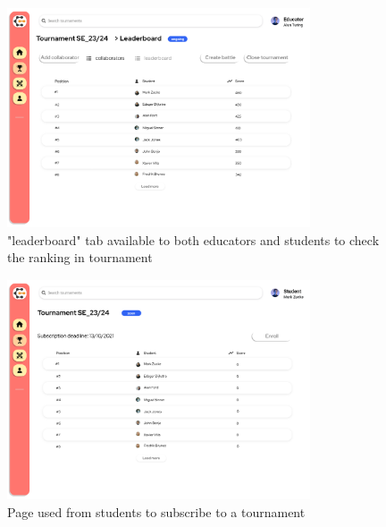 \begin{figure}[H]
    \centering
    \includegraphics[width=0.8\textwidth]{Mockups/8_educator_tournament_leaderboard.png}
    \caption{"leaderboard" tab available to both educators and students to check the ranking in tournament}
\end{figure}
\begin{figure}[H]
    \centering
    \includegraphics[width=0.8\textwidth]{Mockups/9_student_tournament_subscription.png}
    \caption{Page used from students to subscribe to a tournament}
\end{figure}

